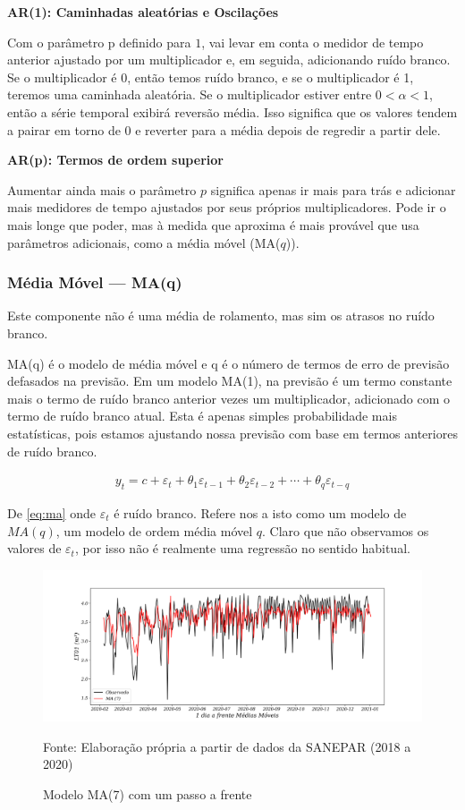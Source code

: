 \textbf{AR(1): Caminhadas aleatórias e Oscilações}



Com o parâmetro p definido para $1$, vai levar em conta o medidor de tempo anterior ajustado por um multiplicador e, em seguida, adicionando ruído branco. Se o multiplicador é $0$, então temos ruído branco, e se o multiplicador é 1, teremos uma caminhada aleatória. Se o multiplicador estiver entre $ 0 < \alpha < 1 $, então a série temporal exibirá reversão média. Isso significa que os valores tendem a pairar em torno de 0 e reverter para a média depois de regredir a partir dele.

\textbf{AR(p): Termos de ordem superior}

Aumentar ainda mais o parâmetro $p$ significa apenas ir mais para trás e adicionar mais medidores de tempo ajustados por seus próprios multiplicadores. Pode ir o mais longe que poder, mas à medida que aproxima é mais provável que usa parâmetros adicionais, como a média móvel (MA($q$)).

\subsubsection{Média Móvel — MA(q)}\label{subsubsec:ma}
Este componente não é uma média de rolamento, mas sim os atrasos no ruído branco. 


MA(q) é o modelo de média móvel e q é o número de termos de erro de previsão defasados na previsão. Em um modelo MA(1), na previsão é um termo constante mais o termo de ruído branco anterior vezes um multiplicador, adicionado com o termo de ruído branco atual. Esta é apenas simples probabilidade mais estatísticas, pois estamos ajustando nossa previsão com base em termos anteriores de ruído branco.

\begin{eqnarray}
	y_t=c+\varepsilon_t+\theta_1 \varepsilon_{t-1}+\theta_2 \varepsilon_{t-2}+\cdots+\theta_q \varepsilon_{t-q}\label{eq:ma}
\end{eqnarray}

De \eqref{eq:ma} onde $\varepsilon_t$ é ruído branco. Refere nos a isto como um modelo de $MA(q)$, um modelo de ordem média móvel $q$. Claro que não observamos os valores de $\varepsilon_t$, por isso não é realmente uma regressão no sentido habitual.

\begin{figure}[H]
	\centering
	\caption{Modelo MA(7) com um passo a frente}
	\label{fig:1-ma}
	\includegraphics[width=1\linewidth]{Modelos/Figuras/1-MA}
	
	Fonte: Elaboração própria a partir de dados da SANEPAR (2018 a 2020)
\end{figure}

